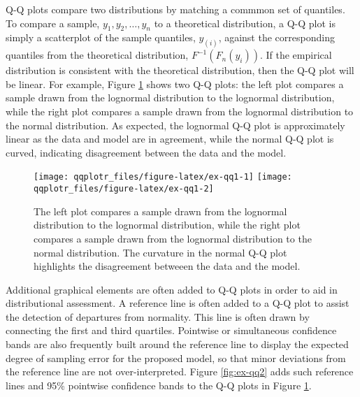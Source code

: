 Q-Q plots compare two distributions by matching a commmon set of
quantiles. To compare a sample, \(y_1, y_2, \ldots, y_n\) to a
theoretical distribution, a Q-Q plot is simply a scatterplot of the
sample quantiles, \(y_{(i)}\), against the corresponding quantiles from
the theoretical distribution, \(F^{-1}\left( F_n(y_i) \right)\). If the
empirical distribution is consistent with the theoretical distribution,
then the Q-Q plot will be linear. For example, Figure \ref{fig:ex-qq1}
shows two Q-Q plots: the left plot compares a sample drawn from the
lognormal distribution to the lognormal distribution, while the right
plot compares a sample drawn from the lognormal distribution to the
normal distribution. As expected, the lognormal Q-Q plot is
approximately linear as the data and model are in agreement, while the
normal Q-Q plot is curved, indicating disagreement between the data and
the model.

\begin{Schunk}
\begin{figure}

{\centering \texttt{[image: qqplotr\_files/figure-latex/ex-qq1-1]} \texttt{[image: qqplotr\_files/figure-latex/ex-qq1-2]} 

}

\caption[The left plot compares a sample drawn from the lognormal distribution to the lognormal distribution, while the right plot compares a sample drawn from the lognormal distribution to the normal distribution]{The left plot compares a sample drawn from the lognormal distribution to the lognormal distribution, while the right plot compares a sample drawn from the lognormal distribution to the normal distribution. The curvature in the normal Q-Q plot highlights the disagreement betweeen the data and the model.}\label{fig:ex-qq1}
\end{figure}
\end{Schunk}

Additional graphical elements are often added to Q-Q plots in order to
aid in distributional assessment. A reference line is often added to a
Q-Q plot to assist the detection of departures from normality. This line
is often drawn by connecting the first and third quartiles. Pointwise or
simultaneous confidence bands are also frequently built around the
reference line to display the expected degree of sampling error for the
proposed model, so that minor deviations from the reference line are not
over-interpreted. Figure \ref{fig:ex-qq2} adds such reference lines and
95\% pointwise confidence bands to the Q-Q plots in Figure
\ref{fig:ex-qq1}.

